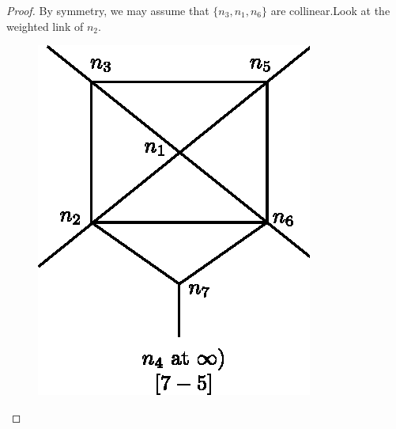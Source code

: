 \begin{proof}
By symmetry, we may assume that $\{ n_3, n_1, n_6 \}$ are
collinear.\break Look at the weighted link of $n_2$. 
\begin{figure}[H]
\centering 
\includegraphics[scale=0.8]{vol58-fig/fig58-47.eps} 
\end{figure}


\end{proof}
